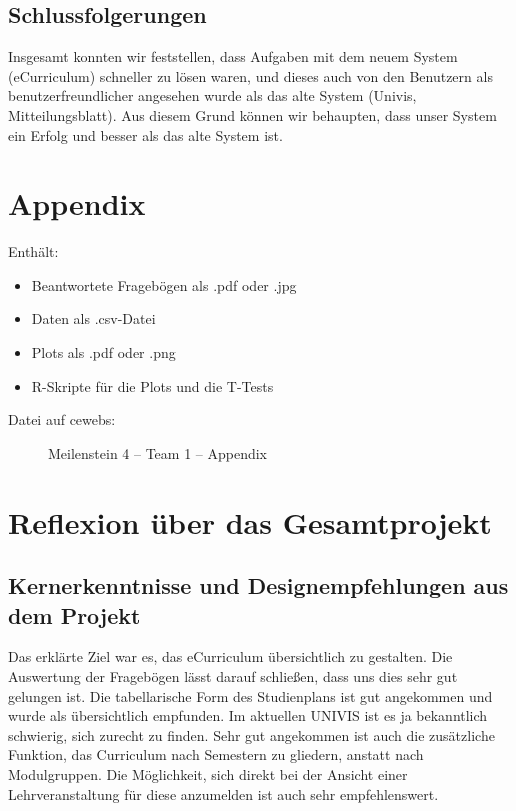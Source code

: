 \documentclass[a4paper,10pt]{scrartcl}
\begin{document}
\subsection{Schlussfolgerungen}

Insgesamt konnten wir feststellen, dass Aufgaben mit dem neuem System (eCurriculum) schneller zu lösen waren, und dieses auch von
den Benutzern als benutzerfreundlicher angesehen wurde als das alte System (Univis, Mitteilungsblatt). Aus diesem Grund können
wir behaupten, dass unser System ein Erfolg und besser als das alte System ist.

\section{Appendix}

Enthält:

\begin{itemize}
 \item Beantwortete Fragebögen als .pdf oder .jpg
 \item Daten als .csv-Datei
 \item Plots als .pdf oder .png
 \item R-Skripte für die Plots und die T-Tests
\end{itemize}


\begin{description}
 \item[Datei auf cewebs:] Meilenstein 4 -- Team 1 -- Appendix
\end{description}

\section{Reflexion über das Gesamtprojekt}

\subsection{Kernerkenntnisse und Designempfehlungen aus dem Projekt}

% 

Das erklärte Ziel war es, das eCurriculum übersichtlich zu gestalten. Die Auswertung der Fragebögen lässt darauf schließen, dass uns dies sehr gut gelungen ist.
Die tabellarische Form des Studienplans ist gut angekommen und wurde als übersichtlich empfunden. Im aktuellen UNIVIS ist es ja bekanntlich schwierig, sich zurecht zu finden. 
Sehr gut angekommen ist auch die zusätzliche Funktion, das Curriculum nach Semestern zu gliedern, anstatt nach Modulgruppen. 
Die Möglichkeit, sich direkt bei der Ansicht einer Lehrveranstaltung für diese anzumelden ist auch sehr empfehlenswert.
\end{document}
